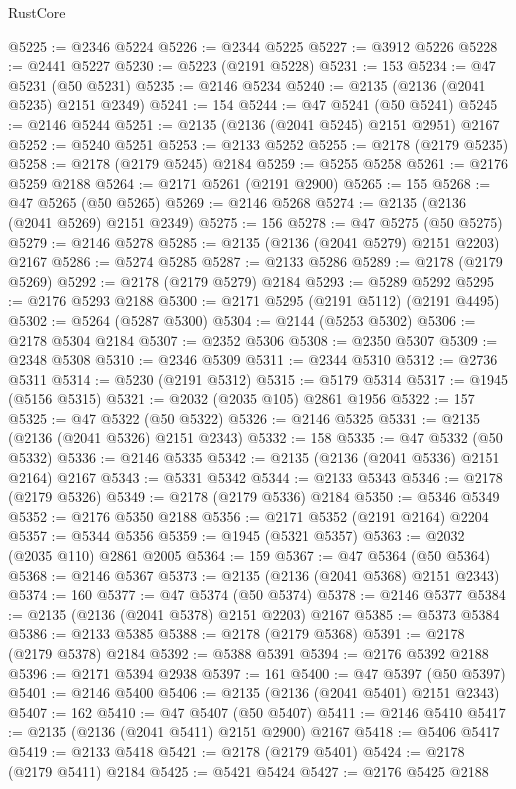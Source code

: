 \begin{lexlean}{RustCore}
\begin{coremodule}
@5225 := @2346 @5224
@5226 := @2344 @5225
@5227 := @3912 @5226
@5228 := @2441 @5227
@5230 := @5223 (@2191 @5228)
@5231 := 153
@5234 := @47 @5231 (@50 @5231)
@5235 := @2146 @5234
@5240 := @2135 (@2136 (@2041 @5235) @2151 @2349)
@5241 := 154
@5244 := @47 @5241 (@50 @5241)
@5245 := @2146 @5244
@5251 := @2135 (@2136 (@2041 @5245) @2151 @2951) @2167
@5252 := @5240 @5251
@5253 := @2133 @5252
@5255 := @2178 (@2179 @5235)
@5258 := @2178 (@2179 @5245) @2184
@5259 := @5255 @5258
@5261 := @2176 @5259 @2188
@5264 := @2171 @5261 (@2191 @2900)
@5265 := 155
@5268 := @47 @5265 (@50 @5265)
@5269 := @2146 @5268
@5274 := @2135 (@2136 (@2041 @5269) @2151 @2349)
@5275 := 156
@5278 := @47 @5275 (@50 @5275)
@5279 := @2146 @5278
@5285 := @2135 (@2136 (@2041 @5279) @2151 @2203) @2167
@5286 := @5274 @5285
@5287 := @2133 @5286
@5289 := @2178 (@2179 @5269)
@5292 := @2178 (@2179 @5279) @2184
@5293 := @5289 @5292
@5295 := @2176 @5293 @2188
@5300 := @2171 @5295 (@2191 @5112) (@2191 @4495)
@5302 := @5264 (@5287 @5300)
@5304 := @2144 (@5253 @5302)
@5306 := @2178 @5304 @2184
@5307 := @2352 @5306
@5308 := @2350 @5307
@5309 := @2348 @5308
@5310 := @2346 @5309
@5311 := @2344 @5310
@5312 := @2736 @5311
@5314 := @5230 (@2191 @5312)
@5315 := @5179 @5314
@5317 := @1945 (@5156 @5315)
@5321 := @2032 (@2035 @105) @2861 @1956
@5322 := 157
@5325 := @47 @5322 (@50 @5322)
@5326 := @2146 @5325
@5331 := @2135 (@2136 (@2041 @5326) @2151 @2343)
@5332 := 158
@5335 := @47 @5332 (@50 @5332)
@5336 := @2146 @5335
@5342 := @2135 (@2136 (@2041 @5336) @2151 @2164) @2167
@5343 := @5331 @5342
@5344 := @2133 @5343
@5346 := @2178 (@2179 @5326)
@5349 := @2178 (@2179 @5336) @2184
@5350 := @5346 @5349
@5352 := @2176 @5350 @2188
@5356 := @2171 @5352 (@2191 @2164) @2204
@5357 := @5344 @5356
@5359 := @1945 (@5321 @5357)
@5363 := @2032 (@2035 @110) @2861 @2005
@5364 := 159
@5367 := @47 @5364 (@50 @5364)
@5368 := @2146 @5367
@5373 := @2135 (@2136 (@2041 @5368) @2151 @2343)
@5374 := 160
@5377 := @47 @5374 (@50 @5374)
@5378 := @2146 @5377
@5384 := @2135 (@2136 (@2041 @5378) @2151 @2203) @2167
@5385 := @5373 @5384
@5386 := @2133 @5385
@5388 := @2178 (@2179 @5368)
@5391 := @2178 (@2179 @5378) @2184
@5392 := @5388 @5391
@5394 := @2176 @5392 @2188
@5396 := @2171 @5394 @2938
@5397 := 161
@5400 := @47 @5397 (@50 @5397)
@5401 := @2146 @5400
@5406 := @2135 (@2136 (@2041 @5401) @2151 @2343)
@5407 := 162
@5410 := @47 @5407 (@50 @5407)
@5411 := @2146 @5410
@5417 := @2135 (@2136 (@2041 @5411) @2151 @2900) @2167
@5418 := @5406 @5417
@5419 := @2133 @5418
@5421 := @2178 (@2179 @5401)
@5424 := @2178 (@2179 @5411) @2184
@5425 := @5421 @5424
@5427 := @2176 @5425 @2188

\end{coremodule}
\end{lexlean}
